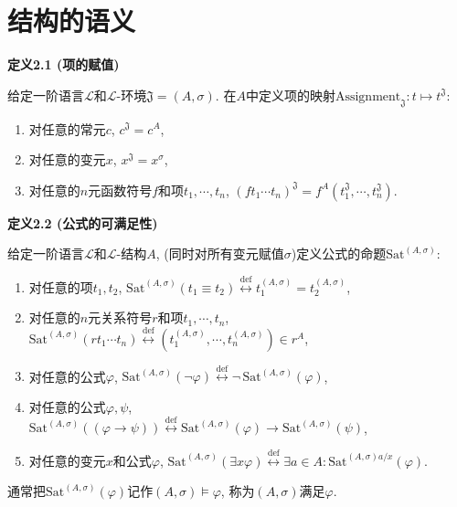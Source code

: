 \documentclass[UTF8]{ctexart}
\begin{document}
\newpage

\section{结构的语义}

\hypertarget{sec:定义2.1}{}
\noindent\textbf{定义2.1 (项的赋值)}

给定一阶语言$\mathcal{L}$和$\mathcal{L}$-环境$\mathfrak{J}=(A,\sigma)$.
在$A$中定义项的映射$\mathrm{Assignment}_{\mathfrak{J}}:t\mapsto t^{\mathfrak{J}}$:
\begin{enumerate}
  \item 对任意的常元$c$, $c^{\mathfrak{J}}=c^A$,
  \item 对任意的变元$x$, $x^{\mathfrak{J}}=x^{\sigma}$,
  \item 对任意的$n$元函数符号$f$和项$t_1,\cdots,t_n$, $(ft_1\cdots t_n)^{\mathfrak{J}}
  =f^{A}(t_1^{\mathfrak{J}},\cdots,t_n^{\mathfrak{J}})$.
\end{enumerate}

\vspace{10pt}

\hypertarget{sec:定义2.2}{}
\noindent\textbf{定义2.2 (公式的可满足性)}

给定一阶语言$\mathcal{L}$和$\mathcal{L}$-结构$A$,
(同时对所有变元赋值$\sigma$)定义公式的命题$\mathrm{Sat}^{(A,\sigma)}$:
\begin{enumerate}
  \item 对任意的项$t_1,t_2$,
  $\mathrm{Sat}^{(A,\sigma)}(t_1\equiv t_2)\overset{\mathrm{def}}{\leftrightarrow}
  t_1^{(A,\sigma)}=t_2^{(A,\sigma)}$,
  \item 对任意的$n$元关系符号$r$和项$t_1,\cdots,t_n$,
  $\mathrm{Sat}^{(A,\sigma)}(rt_1\cdots t_n)\overset{\mathrm{def}}{\leftrightarrow}
  (t_1^{(A,\sigma)},\cdots,t_n^{(A,\sigma)})\in r^A$,
  \item 对任意的公式$\varphi$,
  $\mathrm{Sat}^{(A,\sigma)}(\neg\varphi)\overset{\mathrm{def}}{\leftrightarrow}
  \neg\,\mathrm{Sat}^{(A,\sigma)}(\varphi)$,
  \item 对任意的公式$\varphi,\psi$,
  $\mathrm{Sat}^{(A,\sigma)}((\varphi\to\psi))\overset{\mathrm{def}}{\leftrightarrow}
  \mathrm{Sat}^{(A,\sigma)}(\varphi)\to\mathrm{Sat}^{(A,\sigma)}(\psi)$,
  \vspace{3pt}
  \item 对任意的变元$x$和公式$\varphi$,
  $\mathrm{Sat}^{(A,\sigma)}(\exists x\varphi)\overset{\mathrm{def}}{\leftrightarrow}
  \exists a\in A:\mathrm{Sat}^{(A,\sigma)a/x}(\varphi)$.
\end{enumerate}
通常把$\mathrm{Sat}^{(A,\sigma)}(\varphi)$记作$(A,\sigma)\models\varphi$,
称为$(A,\sigma)$满足$\varphi$.
\end{document}
